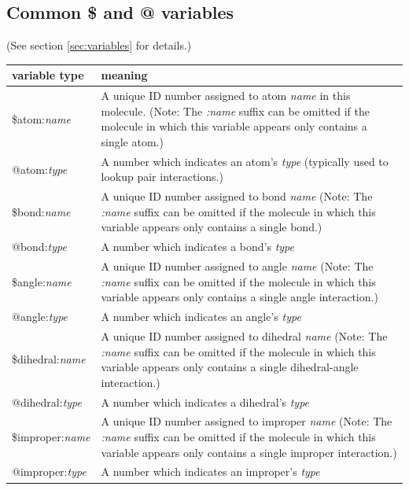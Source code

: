 \documentclass[11pt]{article}
\begin{document}
\subsection{Common \$ and @ variables}

(See section \ref{sec:variables} for details.) \\
\begin{tabular}[h]{l|p{11cm}}
\textbf{variable type} & \textbf{meaning}
\\
\hline
\hline
\$atom:\textit{name}  &
A unique ID number assigned to atom \textit{name} in this molecule. 
(Note: The \textit{:name} suffix can be omitted if the molecule
in which this variable appears only contains a single atom.)
\\
\hline
@atom:\textit{type}   & 
A number which indicates an atom's \textit{type}
               (typically used to lookup pair interactions.)
\\
\hline
\$bond:\textit{name}  & 
A unique ID number assigned to bond \textit{name}
(Note: The \textit{:name} suffix can be omitted if the molecule
in which this variable appears only contains a single bond.)
\\
\hline
@bond:\textit{type}   & 
A number which indicates a bond's \textit{type}
\\
\hline
\$angle:\textit{name}  & 
A unique ID number assigned to angle \textit{name}
(Note: The \textit{:name} suffix can be omitted if the molecule
in which this variable appears only contains a single angle interaction.)
\\
\hline
@angle:\textit{type}   & 
A number which indicates an angle's \textit{type}
\\
\hline
\$dihedral:\textit{name} & 
A unique ID number assigned to dihedral \textit{name}
(Note: The \textit{:name} suffix can be omitted if the molecule in which 
this variable appears only contains a single dihedral-angle interaction.)
\\
\hline
@dihedral:\textit{type}  & 
A number which indicates a dihedral's \textit{type}
\\
\hline
\$improper:\textit{name}  & 
A unique ID number assigned to improper \textit{name}
(Note: The \textit{:name} suffix can be omitted if the molecule in which 
this variable appears only contains a single improper interaction.)
\\
\hline
@improper:\textit{type}   & 
A number which indicates an improper's \textit{type}
\\

\end{tabular}
\end{document}
